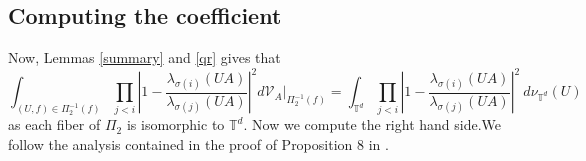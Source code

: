 \documentclass[10pt]{amsart}
\numberwithin{equation}{section}     %
\newcommand{\T}{\mathbb{T}}
\newcommand{\V}{\mathcal{V}}
\newcommand{\cD}{\mathcal{D}}\newcommand{\cE}{\mathcal{E}}\newcommand{\cF}{\mathcal{F}}
\newcommand{\cV}{\mathcal{V}}\newcommand{\cW}{\mathcal{W}}\newcommand{\cX}{\mathcal{X}}
\newcommand{\FF}{\mathbb{F}}
\newcommand{\U}{\mathrm{U}}
\begin{document}


    


        



\subsection{Computing the coefficient} \label{computationally}


Now, Lemmas \ref{summary} and \ref{qr} gives that $$\int_{(U,f) \in \Pi_2^{-1}(f)} \prod \limits_{j < i} \left| 1 - \frac{\lambda_{\sigma(i)}(UA)}{\lambda_{\sigma(j)}(UA)} \right|^{2} 
 d \cV_A|_{\Pi_2^{-1}(f)} = \int_{\T^d}  \prod \limits_{j < i} \left| 1 - \frac{\lambda_{\sigma(i)}(UA)}{\lambda_{\sigma(j)}(UA)} \right|^{2} \ d\nu_{\T^d}(U)$$ as each fiber of $\Pi_2$ is isomorphic to $\T^d.$ Now we compute the right hand side.We follow the analysis contained in the proof of Proposition 8 in \cite{dedieu2003mike}.
\end{document}
